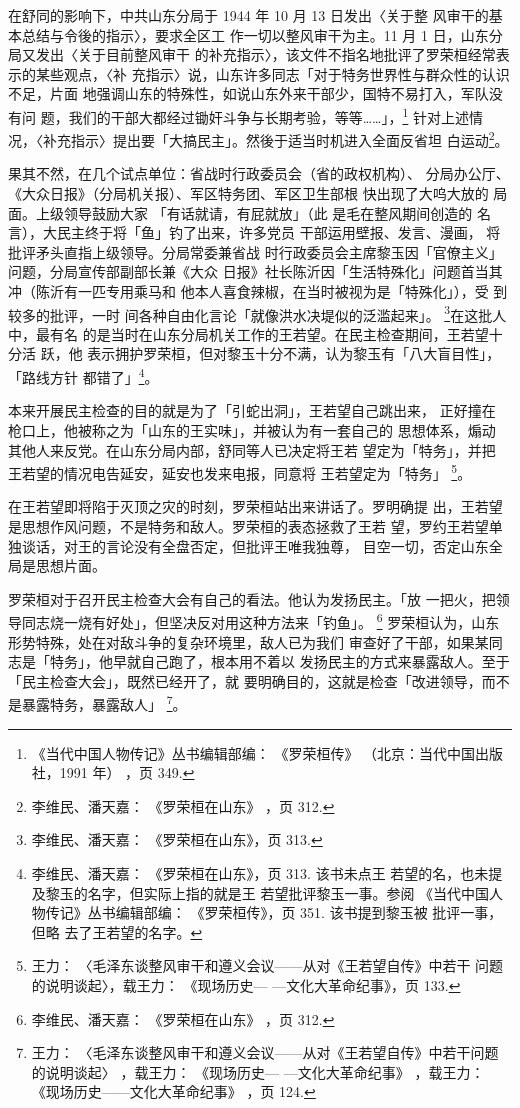 在舒同的影响下，中共山东分局于 1944 年 10 月 13 日发出〈关于整
风审干的基本总结与令後的指示〉，要求全区工
作一切以整风审干为主。11 月 1 日，山东分局又发出〈关于目前整风审干
的补充指示〉，该文件不指名地批评了罗荣桓经常表示的某些观点，〈补
充指示〉说，山东许多同志「对于特务世界性与群众性的认识不足，片面
地强调山东的特殊性，如说山东外来干部少，国特不易打入，军队没有问
题，我们的干部大都经过锄奸斗争与长期考验，等等……」，\footnote{《当代中国人物传记》丛书编辑部编：
《罗荣桓传》
（北京：当代中国出版社，1991 年）
，页 349.} 针对上述情
况，〈补充指示〉提出要「大搞民主」。然後于适当时机进入全面反省坦
白运动\footnote{李维民、潘天嘉：
《罗荣桓在山东》
，页 312.}。

果其不然，在几个试点单位：省战时行政委员会（省的政权机构）、 分局办公厅、
《大众日报》（分局机关报）、军区特务团、军区卫生部根 快出现了大呜大放的
局面。上级领导鼓励大家 「有话就请，有屁就放」（此 是毛在整风期间创造的
名言），大民主终于将「鱼」钓了出来，许多党员 干部运用壁报、发言、漫画，
将批评矛头直指上级领导。分局常委兼省战 时行政委员会主席黎玉因「官僚主义」
问题，分局宣传部副部长兼《大众 日报》社长陈沂因「生活特殊化」问题首当其
冲（陈沂有一匹专用乘马和 他本人喜食辣椒，在当时被视为是「特殊化」），受
到较多的批评，一时 间各种自由化言论「就像洪水决堤似的泛滥起来」。
\footnote{李维民、潘天嘉： 《罗荣桓在山东》，页 313.}在这批人中，最有名
的是当时在山东分局机关工作的王若望。在民主检查期间，王若望十分活 跃，他
表示拥护罗荣桓，但对黎玉十分不满，认为黎玉有「八大盲目性」， 「路线方针
都错了」\footnote{李维民、潘天嘉： 《罗荣桓在山东》，页 313. 该书未点王
若望的名，也未提及黎玉的名字，但实际上指的就是王 若望批评黎玉一事。参阅
《当代中国人物传记》丛书编辑部编： 《罗荣桓传》，页 351. 该书提到黎玉被
批评一事，但略 去了王若望的名字。}。
 
本来开展民主检查的目的就是为了「引蛇出洞」，王若望自己跳出来， 正好撞在
枪口上，他被称之为「山东的王实味」，并被认为有一套自己的 思想体系，煽动
其他人来反党。在山东分局内部，舒同等人已决定将王若 望定为「特务」，并把
王若望的情况电告延安，延安也发来电报，同意将 王若望定为「特务」
\footnote{王力： 〈毛泽东谈整风审干和遵义会议——从对《王若望自传》中若干
问题的说明谈起〉，载王力： 《现场历史— —文化大革命纪事》，页 133.}。

在王若望即将陷于灭顶之灾的时刻，罗荣桓站出来讲话了。罗明确提
出，王若望是思想作风问题，不是特务和敌人。罗荣桓的表态拯救了王若
望，罗约王若望单独谈话，对王的言论没有全盘否定，但批评王唯我独尊，
目空一切，否定山东全局是思想片面。

罗荣桓对于召开民主检查大会有自己的看法。他认为发扬民主。「放
一把火，把领导同志烧一烧有好处」，但坚决反对用这种方法来「钓鱼」。
\footnote{李维民、潘天嘉：
《罗荣桓在山东》
，页 312.}
罗荣桓认为，山东形势特殊，处在对敌斗争的复杂环境里，敌人已为我们
审查好了干部，如果某同志是「特务」，他早就自己跑了，根本用不着以
发扬民主的方式来暴露敌人。至于「民主检查大会」，既然已经开了，就
要明确目的，这就是检查「改进领导，而不是暴露特务，暴露敌人」
\footnote{王力：
〈毛泽东谈整风审干和遵义会议——从对《王若望自传》中若干问题的说明谈起〉
，载王力：
《现场历史—
—文化大革命纪事》
，载王力：
《现场历史——文化大革命纪事》
，页 124.}。

